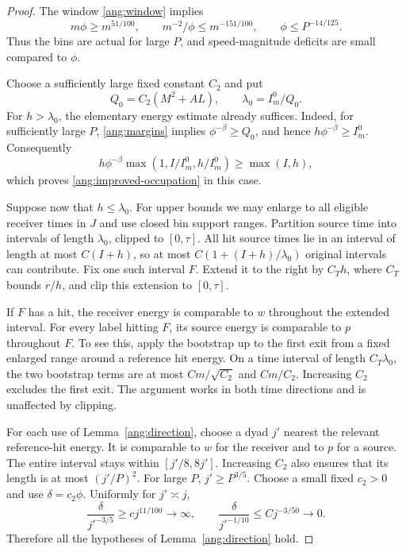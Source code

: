 \begin{proof}
The window \eqref{ang:window} implies
\begin{equation}\label{ang:margins}
 m\phi\ge m^{51/100},\qquad
 m^{-2}/\phi\le m^{-151/100},\qquad
 \phi\le P^{-14/125}.
\end{equation}
Thus the bins are actual for large $P$, and speed-magnitude deficits
are small compared to $\phi$.

Choose a sufficiently large fixed constant $C_2$ and put
\[
 Q_0=C_2(M^2+AL),\qquad \lambda_0=I_m^0/Q_0.
\]
For $h>\lambda_0$, the elementary energy estimate already suffices.
Indeed, for sufficiently large $P$, \eqref{ang:margins} implies
$\phi^{-\beta}\ge Q_0$, and hence $h\phi^{-\beta}\ge I_m^0$.
Consequently
\[
 h\phi^{-\beta}\max(1,I/I_m^0,h/I_m^0)\ge\max(I,h),
\]
which proves \eqref{ang:improved-occupation} in this case.

Suppose now that $h\le\lambda_0$. For upper bounds we may enlarge to all
eligible receiver times in $J$ and use closed bin support ranges.
Partition source time into intervals
of length $\lambda_0$, clipped to $[0,\tau]$. All hit
source times lie in an interval of length at most $C(I+h)$, so at most
$C(1+(I+h)/\lambda_0)$ original intervals can contribute.
Fix one such interval $F$. Extend it to the right by $C_T h$, where
$C_T$ bounds $r/h$, and clip this extension to $[0,\tau]$.

If $F$ has a hit, the receiver energy is comparable to $w$ throughout
the extended interval. For every label hitting $F$, its source energy
is comparable to $p$ throughout $F$. To see this, apply the bootstrap
up to the first exit from a fixed enlarged range around a reference
hit energy. On a time interval of length $C_T\lambda_0$, the two
bootstrap terms are at most $Cm/\sqrt{C_2}$ and $Cm/C_2$.
Increasing $C_2$ excludes the first exit. The argument works in both
time directions and is unaffected by clipping.

For each use of Lemma~\ref{ang:direction}, choose a dyad $j'$ nearest
the relevant reference-hit energy. It is comparable to $w$ for the
receiver and to $p$ for a source. The entire interval stays within
$[j'/8,8j']$. Increasing $C_2$ also ensures that its length is at most
$(j'/P)^2$. For large $P$, $j'\ge P^{3/5}$. Choose a small fixed
$c_2>0$ and use $\delta=c_2\phi$. Uniformly for $j'\asymp j$,
\[
 \frac{\delta}{j'^{-3/5}}\ge c j^{11/100}\longrightarrow\infty,
 \qquad
 \frac{\delta}{j'^{-1/10}}\le Cj^{-3/50}\longrightarrow0.
\]
Therefore all the hypotheses of Lemma~\ref{ang:direction} hold.


\end{proof}
